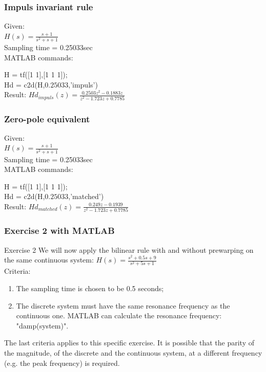 \begin{frame}
	\frametitle{Impuls invariant rule}
	\begin{example}
		Given:\\
		$H(s) = \frac{s + 1}{s^{2} + s + 1}$\\
		Sampling time = 0.25033sec\\
		\vspace{1em}
		MATLAB commands:
		
		H = tf([1 1],[1 1 1]); \\
		Hd = c2d(H,$0.25033$,'impuls')\\
		\vspace{1em}
		Result:
		$Hd_{impuls}(z) = \frac{0.2503z^{2} - 0.1883z}{z^{2} - 1.723z + 0.7785}$
	\end{example}
\end{frame}

\begin{frame}
	\frametitle{Zero-pole equivalent}
	\begin{example}
		Given:\\
		$H(s) = \frac{s + 1}{s^{2} + s + 1}$\\
		Sampling time = 0.25033sec\\
		\vspace{1em}
		MATLAB commands:
		
		H = tf([1 1],[1 1 1]); \\
		Hd = c2d(H,$0.25033$,'matched')\\
		\vspace{1em}
		Result: 
		$Hd_{matched}(z) = \frac{0.249z - 0.1939}{z^{2} - 1.723z + 0.7785}$
	\end{example}
\end{frame}

\begin{frame}
	\frametitle{Exercise 2 with MATLAB}
	\begin{block}{Exercise 2}
		We will now apply the bilinear rule with and without prewarping on the same continuous system: $H(s) = \frac{s^{2} + 0.5s + 9}{s^{2} + 5s + 1}$\\
		\vspace{0.5em}
		Criteria: 
		\begin{enumerate}
			\item The sampling time is chosen to be 0.5 seconds;\\
			\item The discrete system must have the same resonance frequency as the continuous one. MATLAB can calculate the resonance frequency: "damp(system)".
		\end{enumerate}
		\vspace{0.5em}
		The last criteria applies to this specific exercise. It is possible that the parity of the magnitude, of the discrete and the continuous system, at a different frequency (e.g. the peak frequency) is required.
	\end{block}	
\end{frame}
		
